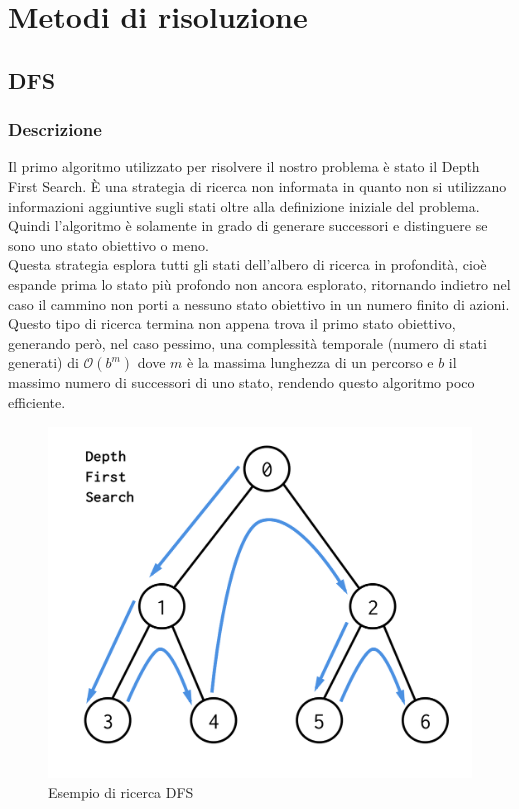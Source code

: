 
\chapter{Metodi di risoluzione}
\label{cap:algoritmi}

\section{DFS}
\subsection{Descrizione}
Il primo algoritmo utilizzato per risolvere il nostro problema è stato il Depth First Search. È una strategia di ricerca non informata in quanto non si utilizzano informazioni aggiuntive sugli stati oltre alla definizione iniziale del problema.
Quindi l'algoritmo è solamente in grado di generare successori e distinguere se sono uno stato obiettivo o meno. \\
Questa strategia esplora tutti gli stati dell'albero di ricerca in profondità, cioè espande prima lo stato più profondo non ancora esplorato, ritornando indietro nel caso il cammino non porti a nessuno stato obiettivo in un numero finito di azioni. \\
Questo tipo di ricerca termina non appena trova il primo stato obiettivo, generando però, nel caso pessimo, una complessità temporale (numero di stati generati) di $\mathcal{O}(b^m)$ dove $m$ è la massima lunghezza di un percorso e $b$ il massimo numero di successori di uno stato, rendendo questo algoritmo poco efficiente.
\begin{figure}[h]
	\centering
	\includegraphics[scale=0.25]{immagini/dfs}
	\caption{Esempio di ricerca DFS}
	\label{fig:dfs}
\end{figure}

